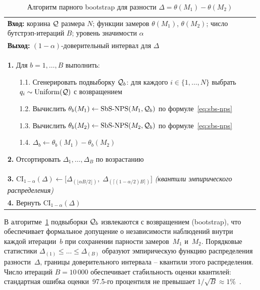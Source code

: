 \begin{table}[htbp]
\centering
\caption{Алгоритм парного bootstrap для разности
$\Delta = \theta(M_1) - \theta(M_2)$}
\label{alg:paired-bootstrap}
\begin{tabular}{@{}p{}@{}}
\textbf{Вход:} корзина $\mathcal{Q}$ размера $N$; функции замеров
$\theta(M_1)$, $\theta(M_2)$; число бутстрэп-итераций $B$;
уровень значимости $\alpha$ \\
\textbf{Выход:} $(1{-}\alpha)$-доверительный интервал для $\Delta$ \\[4pt]
\textbf{1.} Для $b = 1, \dots, B$ выполнить:
\begin{itemize}
    \item[1.1.] Сгенерировать подвыборку $\mathcal{Q}_b$: для каждого
        $i \in \{1, \dots, N\}$ выбрать
        $q_i \sim \mathrm{Uniform}(\mathcal{Q})$ с возвращением
    \item[1.2.] Вычислить $\theta_b(M_1) \leftarrow
        \mathrm{SbS\text{-}NPS}(M_1, \mathcal{Q}_b)$ по формуле~\eqref{eq:sbs-nps}
    \item[1.3.] Вычислить $\theta_b(M_2) \leftarrow
        \mathrm{SbS\text{-}NPS}(M_2, \mathcal{Q}_b)$ по формуле~\eqref{eq:sbs-nps}
    \item[1.4.] $\Delta_b \leftarrow \theta_b(M_1) - \theta_b(M_2)$
\end{itemize}
\textbf{2.} Отсортировать $\Delta_1, \dots, \Delta_B$ по возрастанию \\
\textbf{3.} $\mathrm{CI}_{1-\alpha}(\Delta) \leftarrow
    \bigl[\Delta_{(\lfloor \alpha B/2 \rfloor)},\;
          \Delta_{(\lceil (1 - \alpha/2) B \rceil)}\bigr]$
    \hfill\textit{(квантили эмпирического распределения)} \\
\textbf{4.} Вернуть $\mathrm{CI}_{1-\alpha}(\Delta)$
\end{tabular}
\end{table}

В алгоритме~\ref{alg:paired-bootstrap} подвыборки $\mathcal{Q}_b$
извлекаются с возвращением (bootstrap), что обеспечивает
формальное допущение о независимости наблюдений внутри каждой
итерации~$b$ при сохранении парности замеров~$M_1$ и~$M_2$.
Порядковые статистики $\Delta_{(1)} \le \dots \le \Delta_{(B)}$
образуют эмпирическую функцию распределения разности~$\Delta$,
границы доверительного интервала -- квантили этого распределения.
Число итераций $B = 10\,000$ обеспечивает стабильность оценки
квантилей: стандартная ошибка оценки~97.5-го процентиля не
превышает $1/\sqrt{B} \approx 1\%$~\cite{efron1993bootstrap}.

